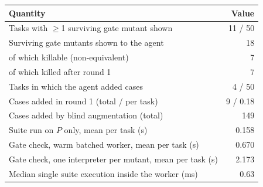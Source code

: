 \begin{tabular}{@{}lr@{}}
\toprule
Quantity & Value\\
\midrule
Tasks with $\geq$1 surviving gate mutant shown & 11 / 50\\
Surviving gate mutants shown to the agent & 18\\
\quad of which killable (non-equivalent) & 7\\
\quad of which killed after round 1 & 7\\
Tasks in which the agent added cases & 4 / 50\\
Cases added in round 1 (total / per task) & 9 / 0.18\\
Cases added by blind augmentation (total) & 149\\
Suite run on $P$ only, mean per task (s) & 0.158\\
Gate check, warm batched worker, mean per task (s) & 0.670\\
Gate check, one interpreter per mutant, mean per task (s) & 2.173\\
Median single suite execution inside the worker (ms) & 0.63\\
\bottomrule
\end{tabular}
